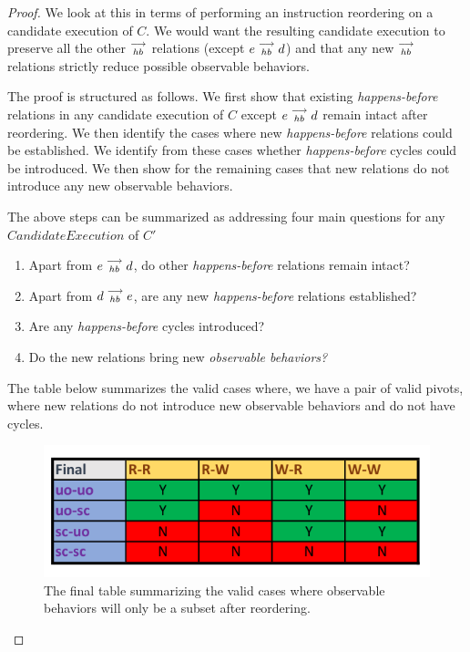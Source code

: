 \begin{proof}

    We look at this in terms of performing an instruction reordering on a candidate execution of $C$. We would want the resulting candidate execution to preserve all the other $\stackrel{\longrightarrow}{_{hb}}$ relations (except $e\stackrel{\longrightarrow}{_{hb}}d$) and that any new $\stackrel{\longrightarrow}{_{hb}}$ relations strictly reduce possible observable behaviors.
    
    The proof is structured as follows. We first show that existing \textit{happens-before} relations in any candidate execution of $C$ except $e\stackrel{\longrightarrow}{_{hb}}d$ remain intact after reordering. We then identify the cases where new \textit{happens-before} relations could be established. We identify from these cases whether \textit{happens-before} cycles could be introduced.
    We then show for the remaining cases that new relations do not introduce any new observable behaviors.

    The above steps can be summarized as addressing four main questions for any $Candidate Execution$ of $C'$
    \begin{enumerate}
        \item Apart from $e\stackrel{\longrightarrow}{_{hb}}d$, do other \emph{happens-before} relations remain intact?
        \item Apart from $d\stackrel{\longrightarrow}{_{hb}}e$, are any new \emph{happens-before} relations established? 
        \item Are any \emph{happens-before} cycles introduced? 
        \item Do the new relations bring new \emph{observable behaviors?}
    \end{enumerate}
    
    
    
    
    

    The table below summarizes the valid cases where, we have a pair of valid pivots, where new relations do not introduce new observable behaviors and do not have cycles. 

    \begin{figure}[H]
        \centering
        \includegraphics[scale=0.7]{InstructionReordering/ValidReorderingProof/part4_table.pdf}
        \caption{The final table summarizing the valid cases where observable behaviors will only be a subset after reordering.}
        \label{fig:my_label}
    \end{figure}


\end{proof}
